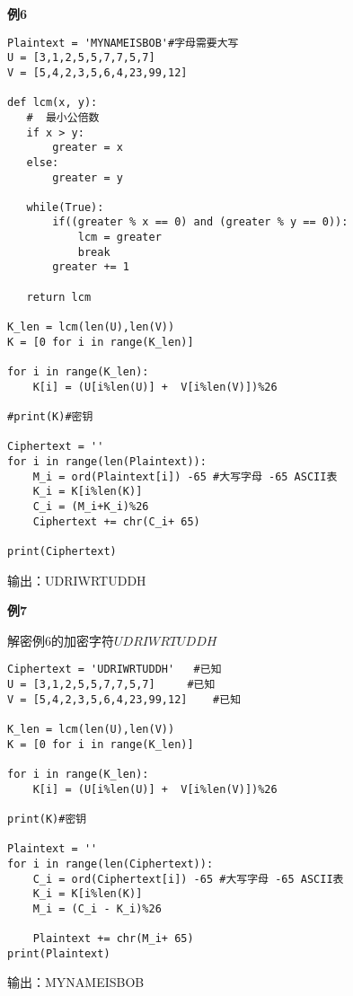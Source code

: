 \documentclass{article}
\begin{document}
\clearpage

\textbf{例6}


\begin{lstlisting}
Plaintext = 'MYNAMEISBOB'#字母需要大写
U = [3,1,2,5,5,7,7,5,7]
V = [5,4,2,3,5,6,4,23,99,12]

def lcm(x, y):
   #  最小公倍数
   if x > y:
       greater = x
   else:
       greater = y
 
   while(True):
       if((greater % x == 0) and (greater % y == 0)):
           lcm = greater
           break
       greater += 1
 
   return lcm

K_len = lcm(len(U),len(V))
K = [0 for i in range(K_len)]

for i in range(K_len):
    K[i] = (U[i%len(U)] +  V[i%len(V)])%26

#print(K)#密钥

Ciphertext = ''
for i in range(len(Plaintext)):
    M_i = ord(Plaintext[i]) -65 #大写字母 -65 ASCII表
    K_i = K[i%len(K)]
    C_i = (M_i+K_i)%26
    Ciphertext += chr(C_i+ 65) 
    
print(Ciphertext)
\end{lstlisting}

输出：UDRIWRTUDDH



\clearpage
\textbf{例7}

解密例6的加密字符$UDRIWRTUDDH$

\begin{lstlisting}
Ciphertext = 'UDRIWRTUDDH'   #已知
U = [3,1,2,5,5,7,7,5,7]     #已知
V = [5,4,2,3,5,6,4,23,99,12]    #已知

K_len = lcm(len(U),len(V))
K = [0 for i in range(K_len)]

for i in range(K_len):
    K[i] = (U[i%len(U)] +  V[i%len(V)])%26

print(K)#密钥

Plaintext = ''
for i in range(len(Ciphertext)):
    C_i = ord(Ciphertext[i]) -65 #大写字母 -65 ASCII表
    K_i = K[i%len(K)]
    M_i = (C_i - K_i)%26

    Plaintext += chr(M_i+ 65) 
print(Plaintext)
\end{lstlisting}

输出：MYNAMEISBOB
\end{document}
